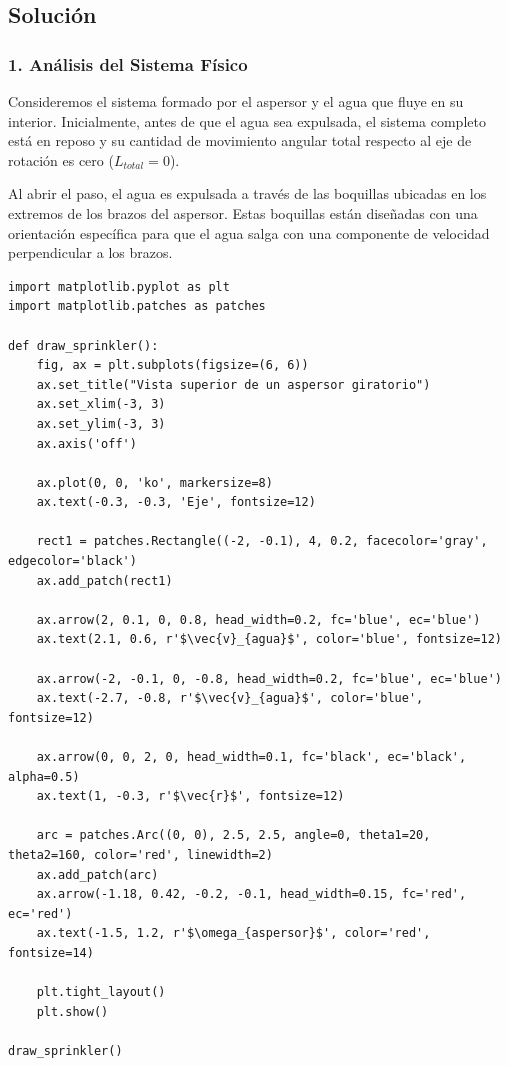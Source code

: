 \documentclass[12pt, a4paper]{article}
\begin{document}
\subsection*{Solución}

\subsubsection*{1. Análisis del Sistema Físico}
Consideremos el sistema formado por el aspersor y el agua que fluye en su interior. Inicialmente, antes de que el agua sea expulsada, el sistema completo está en reposo y su cantidad de movimiento angular total respecto al eje de rotación es cero ($L_{total} = 0$).

Al abrir el paso, el agua es expulsada a través de las boquillas ubicadas en los extremos de los brazos del aspersor. Estas boquillas están diseñadas con una orientación específica para que el agua salga con una componente de velocidad perpendicular a los brazos.

\begin{lstlisting}
import matplotlib.pyplot as plt
import matplotlib.patches as patches

def draw_sprinkler():
    fig, ax = plt.subplots(figsize=(6, 6))
    ax.set_title("Vista superior de un aspersor giratorio")
    ax.set_xlim(-3, 3)
    ax.set_ylim(-3, 3)
    ax.axis('off')

    ax.plot(0, 0, 'ko', markersize=8)
    ax.text(-0.3, -0.3, 'Eje', fontsize=12)

    rect1 = patches.Rectangle((-2, -0.1), 4, 0.2, facecolor='gray', edgecolor='black')
    ax.add_patch(rect1)

    ax.arrow(2, 0.1, 0, 0.8, head_width=0.2, fc='blue', ec='blue')
    ax.text(2.1, 0.6, r'$\vec{v}_{agua}$', color='blue', fontsize=12)
    
    ax.arrow(-2, -0.1, 0, -0.8, head_width=0.2, fc='blue', ec='blue')
    ax.text(-2.7, -0.8, r'$\vec{v}_{agua}$', color='blue', fontsize=12)

    ax.arrow(0, 0, 2, 0, head_width=0.1, fc='black', ec='black', alpha=0.5)
    ax.text(1, -0.3, r'$\vec{r}$', fontsize=12)

    arc = patches.Arc((0, 0), 2.5, 2.5, angle=0, theta1=20, theta2=160, color='red', linewidth=2)
    ax.add_patch(arc)
    ax.arrow(-1.18, 0.42, -0.2, -0.1, head_width=0.15, fc='red', ec='red')
    ax.text(-1.5, 1.2, r'$\omega_{aspersor}$', color='red', fontsize=14)

    plt.tight_layout()
    plt.show()

draw_sprinkler()
\end{lstlisting}
\end{document}
